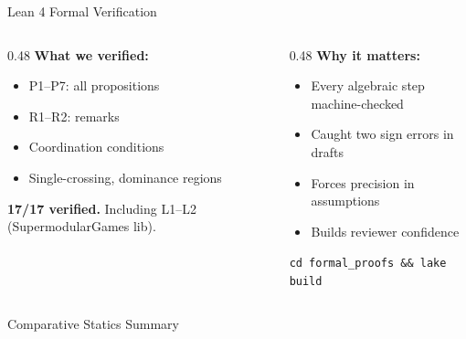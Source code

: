\documentclass[
  ignorenonframetext,
  aspectratio=169]{beamer}
\begin{document}
\begin{frame}{Lean 4 Formal Verification}
\protect{}\label{lean-4-formal-verification}
\begin{columns}[T]
\begin{column}{0.48\textwidth}
\small
\textbf{What we verified:}
\begin{itemize}
  \item P1--P7: all propositions
  \item R1--R2: remarks
  \item Coordination conditions
  \item Single-crossing, dominance regions
\end{itemize}
\vspace{0.1cm}
\textbf{17/17 verified.} Including L1--L2 (SupermodularGames lib).
\end{column}
\begin{column}{0.48\textwidth}
\small
\textbf{Why it matters:}
\begin{itemize}
  \item Every algebraic step machine-checked
  \item Caught two sign errors in drafts
  \item Forces precision in assumptions
  \item Builds reviewer confidence
\end{itemize}
\vspace{0.1cm}
\texttt{cd formal\_proofs \&\& lake build}
\end{column}
\end{columns}
\end{frame}

\begin{frame}{Comparative Statics Summary}
\protect{}\label{comparative-statics-summary}
\begin{table}[!h]
\centering\begingroup\fontsize{9}{11}\selectfont

\endgroup{}
\end{table}
\end{frame}
\end{document}
